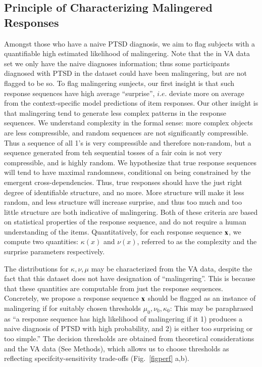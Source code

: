 \documentclass[onecolumn,10pt]{IEEEtran}
\def\Methods{Online Methods}
\def\Methods{Methods\xspace}
\begin{document}
\subsection*{Principle of Characterizing Malingered Responses}
Amongst those who have a naive PTSD diagnosis, we aim to flag subjects with  a quantifiable high estimated likelihood of malingering. Note that the in VA data set we only have the naive diagnoses information; thus some participants diagnosed with PTSD in the dataset could have been malingering, but are not flagged to be so. To flag malingering sunjects, our first insight  is that such response sequences  have high average ``surprise'', $i.e. $ deviate more on average from the context-specific model predictions of item responses. Our other insight is that malingering tend to generate  less complex patterns in the response sequences. We understand complexity in the formal sense: more complex objects are less compressible, and  random sequences are not significantly compressible. Thus a sequence of all 1's is very compressible and therefore non-random, but a sequence generated from teh sequential tosses of a fair coin is not very compressible, and is highly random. We hypothesize that true response sequences  will tend to have maximal randomness, conditional on  being constrained by the emergent cross-dependencies. Thus, true responses  should have the just right  degree of identifiable structure, and  no more. More structure will make it less random, and less structure will increase surprise, and thus too much and too little structure are both indicative of malingering. Both of these criteria are based on statistical properties of the response sequence, and do not require a human understanding of the items. Quantitatively, for each response sequence $\bm{\mathrm{x}}$, we compute two quantities: $\kappa(x)$ and  $\nu(x)$, referred to as the complexity  and the surprise parameters respectively.

The distributions for  $\kappa, \nu, \mu$   may be characterized from the VA data, despite the fact that this dataset does not have  designation of ``malingering''. This is because that these quantities are computable from just the response sequences. Concretely, we propose  a response sequence $\bm{\mathrm{x}}$  should be flagged as an instance of malingering if for  suitably chosen thresholds $\mu_0,\nu_0, \kappa_0$:
  This may be paraphrased as ``a response sequence has high likelihood of malingering if it 1)  produces a naive diagnosis of PTSD with high probability, and 2) is either too surprising or too simple.'' The decision thresholds are obtained from theoretical considerations and the VA data (See \Methods), which allows us to choose thresholds as reflecting specifcity-sensitivity trade-offs (Fig.~\ref{figperf} a,b).
  
\end{document}
